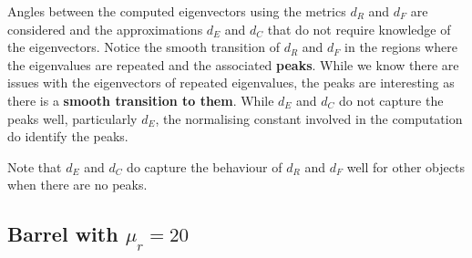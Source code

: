 \documentclass[a4paper,12]{article}
\theoremstyle{definition}
\begin{document}
 Angles between the computed eigenvectors using the metrics $d_R$ and $d_F$ are considered and  the approximations $d_E$ and $d_C$ that do not require knowledge of the eigenvectors. Notice the smooth transition of   $d_R$ and $d_F$ in the regions where the eigenvalues are repeated  and the associated {\bf peaks}.
While we know there are issues with the eigenvectors of repeated eigenvalues, the peaks are interesting as there is a {\bf smooth transition to them}.
  While $d_E$ and $d_C$ do not capture the peaks well, particularly $d_E$,  the normalising constant involved in the computation do identify the peaks.
  
  Note that $d_E$ and $d_C$ do capture the behaviour of $d_R$ and $d_F$ well for other objects when there are no peaks.



\clearpage
{}
\subsection{Barrel with $\mu_r=20$}
\end{document}
